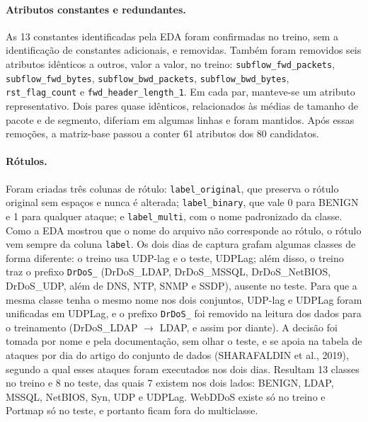 \documentclass[
    12pt,                %
    openright,           %
    oneside,             %
    a4paper,             %
    english,             %
    brazil               %
]{abntex2}
\begin{document}
\paragraph{Atributos constantes e redundantes.}
As 13 constantes identificadas pela EDA foram confirmadas no treino, sem a identificação de constantes adicionais, e removidas. Também foram removidos seis atributos idênticos a outros, valor a valor, no treino: \texttt{subflow\_fwd\_packets}, \texttt{subflow\_fwd\_bytes}, \texttt{subflow\_bwd\_packets}, \texttt{subflow\_bwd\_bytes}, \texttt{rst\_flag\_count} e \texttt{fwd\_header\_length\_1}. Em cada par, manteve-se um atributo representativo. Dois pares quase idênticos, relacionados às médias de tamanho de pacote e de segmento, diferiam em algumas linhas e foram mantidos. Após essas remoções, a matriz-base passou a conter 61 atributos dos 80 candidatos.

\paragraph{Rótulos.}
Foram criadas três colunas de rótulo: \texttt{label\_original}, que preserva o rótulo original sem espaços e nunca é alterada; \texttt{label\_binary}, que vale 0 para BENIGN e 1 para qualquer ataque; e \texttt{label\_multi}, com o nome padronizado da classe. Como a EDA mostrou que o nome do arquivo não corresponde ao rótulo, o rótulo vem sempre da coluna \texttt{label}. Os dois dias de captura grafam algumas classes de forma diferente: o treino usa UDP-lag e o teste, UDPLag; além disso, o treino traz o prefixo \texttt{DrDoS\_} (DrDoS\_LDAP, DrDoS\_MSSQL, DrDoS\_NetBIOS, DrDoS\_UDP, além de DNS, NTP, SNMP e SSDP), ausente no teste. Para que a mesma classe tenha o mesmo nome nos dois conjuntos, UDP-lag e UDPLag foram unificadas em UDPLag, e o prefixo \texttt{DrDoS\_} foi removido na leitura dos dados para o treinamento (DrDoS\_LDAP $\rightarrow$ LDAP, e assim por diante). A decisão foi tomada por nome e pela documentação, sem olhar o teste, e se apoia na tabela de ataques por dia do artigo do conjunto de dados (SHARAFALDIN et al., 2019), segundo a qual esses ataques foram executados nos dois dias. Resultam 13 classes no treino e 8 no teste, das quais 7 existem nos dois lados: BENIGN, LDAP, MSSQL, NetBIOS, Syn, UDP e UDPLag. WebDDoS existe só no treino e Portmap só no teste, e portanto ficam fora do multiclasse.
\end{document}
